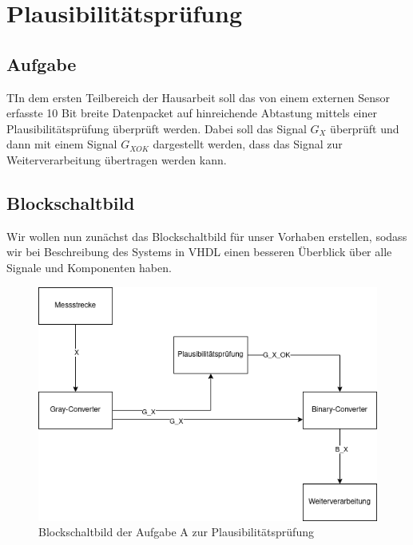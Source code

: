 \documentclass{report}
\begin{document}
\newpage


\tableofcontents

\listoffigures

\listoflistings

\newpage
\renewcommand{\thechapter}{A}

\chapter{Plausibilitätsprüfung}
\label{cha:teil-plausibilitat}
\newpage
\section{Aufgabe}
\label{sec:einleitung}

\begin{task}
  TIn dem ersten Teilbereich der Hausarbeit soll das von einem externen Sensor erfasste 10 Bit breite Datenpacket auf hinreichende Abtastung mittels einer Plausibilitätsprüfung überprüft werden. Dabei soll das Signal $G_X$ überprüft und dann mit einem Signal $G_{XOK}$ dargestellt werden, dass das Signal zur Weiterverarbeitung übertragen werden kann.
\end{task}

\section{Blockschaltbild}
\label{sec:blockschaltbild}

Wir wollen nun zunächst das Blockschaltbild für unser Vorhaben erstellen, sodass wir bei Beschreibung des Systems in VHDL einen besseren Überblick über alle Signale und Komponenten haben.

\begin{figure}[h]
  \centering
  \includegraphics[width=\textwidth]{../assets/images/DIHA/blockschaltbilda.png}
  \caption{Blockschaltbild der Aufgabe A zur Plausibilitätsprüfung}
  \label{fig:blockA}
\end{figure}
\end{document}
